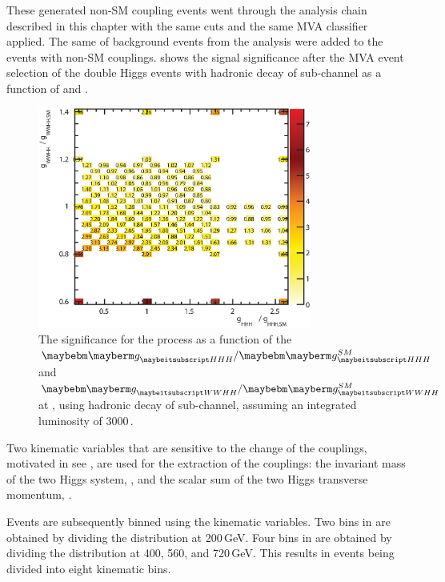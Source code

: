 These generated non-SM coupling \eeToHH events went through the analysis chain described in this chapter with the same cuts and the same MVA classifier applied. The same of background events from the  analysis were added to the \eeToHH events with non-SM couplings.  shows the  signal significance after the MVA event selection of the double Higgs events with hadronic \WW decay of \eeToHHbbWW sub-channel as a function of  \gHHH and \gWWHH.

\begin{figure}[!htbp]
    \includegraphics[width=0.8\textwidth]{doubleHiggs/extraction/SignificanceBono4}
\caption{The significance for the \eeToHH process as a function of the $\gHHH/\gHHHSM$ and  $\gWWHH/\gWWHHSM$ at , using  hadronic \WW decay of \eeToHHbbWW sub-channel, assuming an integrated luminosity of  3000\,.}
   \label{fig:doubleHiggsCouplingSignificancebbWW}
\end{figure}


Two kinematic variables that are sensitive to the change of the couplings, motivated in see , are used for the extraction of the couplings: the invariant mass of the two Higgs system, \mhh, and the scalar sum of the two Higgs transverse momentum, \HT.

Events are subsequently binned using the kinematic variables. Two bins in \HT are obtained by dividing the \HT distribution at 200\,GeV. Four bins in \mhh are obtained by dividing the \mhh distribution at 400, 560, and 720\,GeV. This results in events being divided into eight kinematic bins.


